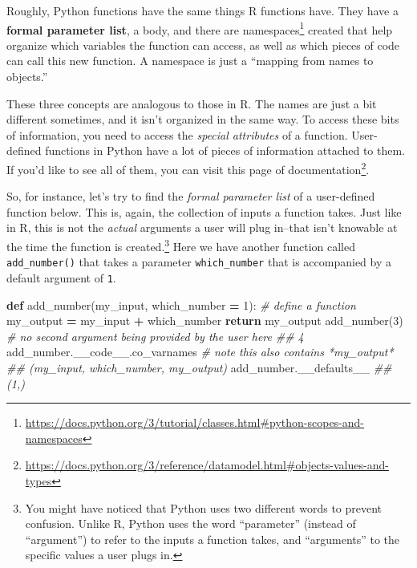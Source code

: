 \documentclass[
  12pt,
  krantz2]{krantz}
\makeatletter
\newenvironment{Shaded}{\begin{snugshade}}{\end{snugshade}}
\newcommand{\CommentTok}[1]{\textcolor[rgb]{0.37,0.37,0.37}{\textit{#1}}}
\newcommand{\ControlFlowTok}[1]{\textcolor[rgb]{0.27,0.27,0.27}{\textbf{#1}}}
\newcommand{\DecValTok}[1]{\textcolor[rgb]{0.06,0.06,0.06}{#1}}
\newcommand{\KeywordTok}[1]{\textcolor[rgb]{0.27,0.27,0.27}{\textbf{#1}}}
\newcommand{\NormalTok}[1]{#1}
\newcommand{\OperatorTok}[1]{\textcolor[rgb]{0.43,0.43,0.43}{\textbf{#1}}}
\renewcommand{\href}[2]{#2\footnote{\url{#1}}}
\newenvironment{kframe}{%
\medskip{}
\setlength{\fboxsep}{.8em}
 \def\at@end@of@kframe{}%
 \ifinner\ifhmode%
  \def\at@end@of@kframe{\end{minipage}}%
  \begin{minipage}{\columnwidth}%
 \fi\fi%
 \def\FrameCommand##1{\hskip\@totalleftmargin \hskip-\fboxsep
 \colorbox{shadecolor}{##1}\hskip-\fboxsep
     \hskip-\linewidth \hskip-\@totalleftmargin \hskip\columnwidth}%
 \MakeFramed {\advance\hsize-\width
   \@totalleftmargin\z@ \linewidth\hsize
   \@setminipage}}%
 {\par\unskip\endMakeFramed%
 \at@end@of@kframe}
\renewenvironment{Shaded}{\begin{kframe}}{\end{kframe}}
\makeatother
\begin{document}
Roughly, Python functions have the same things R functions have. They have a \textbf{formal parameter list}, a body, and there are \href{https://docs.python.org/3/tutorial/classes.html\#python-scopes-and-namespaces}{namespaces} created that help organize which variables the function can access, as well as which pieces of code can call this new function. A namespace is just a ``mapping from names to objects.''

These three concepts are analogous to those in R. The names are just a bit different sometimes, and it isn't organized in the same way. To access these bits of information, you need to access the \emph{special attributes} of a function. User-defined functions in Python have a lot of pieces of information attached to them. If you'd like to see all of them, you can visit \href{https://docs.python.org/3/reference/datamodel.html\#objects-values-and-types}{this page of documentation}.

So, for instance, let's try to find the \emph{formal parameter list} of a user-defined function below. This is, again, the collection of inputs a function takes. Just like in R, this is not the \emph{actual} arguments a user will plug in--that isn't knowable at the time the function is created.\footnote{You might have noticed that Python uses two different words to prevent confusion. Unlike R, Python uses the word ``parameter'' (instead of ``argument'') to refer to the inputs a function takes, and ``arguments'' to the specific values a user plugs in.} Here we have another function called \texttt{add\_number()} that takes a parameter \texttt{which\_number} that is accompanied by a default argument of \texttt{1}.

\begin{Shaded}
\begin{Highlighting}[]
\KeywordTok{def}\NormalTok{ add\_number(my\_input, which\_number }\OperatorTok{=} \DecValTok{1}\NormalTok{): }\CommentTok{\# define a function}
\NormalTok{  my\_output }\OperatorTok{=}\NormalTok{ my\_input }\OperatorTok{+}\NormalTok{ which\_number}
  \ControlFlowTok{return}\NormalTok{ my\_output}
\NormalTok{add\_number(}\DecValTok{3}\NormalTok{) }\CommentTok{\# no second argument being provided by the user here}
\CommentTok{\#\# 4}
\NormalTok{add\_number.\_\_code\_\_.co\_varnames }\CommentTok{\# note this also contains *my\_output*}
\CommentTok{\#\# (\textquotesingle{}my\_input\textquotesingle{}, \textquotesingle{}which\_number\textquotesingle{}, \textquotesingle{}my\_output\textquotesingle{})}
\NormalTok{add\_number.\_\_defaults\_\_}
\CommentTok{\#\# (1,)}
\end{Highlighting}
\end{Shaded}
\end{document}
